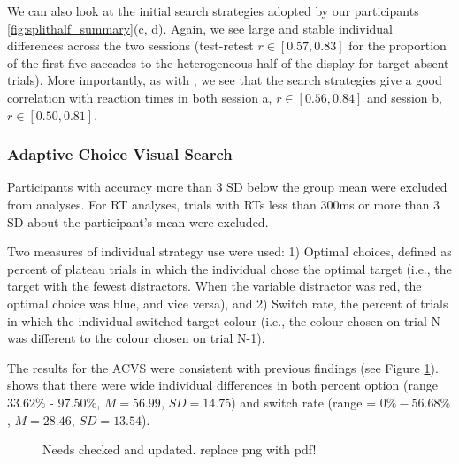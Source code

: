 \documentclass[]{rsos}%
\begin{document}
We can also look at the initial search strategies adopted by our participants \ref{fig:splithalf_summary}(c, d). Again, we see large and stable individual differences across the two sessions (test-retest $r \in [0.57, 0.83]$ for the proportion of the first five saccades to the heterogeneous half of the display for target absent trials). More importantly, as with \cite{nowakowska2017}, we see that the search strategies give a good correlation with reaction times in both session a, $r \in [0.56, 0.84]$ and session b, $r \in [0.50, 0.81]$.


\subsubsection{Adaptive Choice Visual Search}

Participants with accuracy more than 3 SD below the group mean were excluded from analyses. For RT analyses, trials with RTs less than 300ms or more than 3 SD about the participant's mean were excluded. 

Two measures of individual strategy use were used: 1) Optimal choices, defined as percent of plateau trials in which the individual chose the optimal target (i.e., the target with the fewest distractors. When the variable distractor was red, the optimal choice was blue, and vice versa), and 2) Switch rate, the percent of trials in which the individual switched target colour (i.e., the colour chosen on trial N was different to the colour chosen on trial N-1).  


The results for the ACVS were consistent with previous findings \cite{irons-leber2016,irons-leber2018} (see Figure \ref{fig:acvs_summary}). shows that there were wide individual differences in both percent option (range $33.62\%$ - $97.50\%$, $M = 56.99$, $SD = 14.75$) and switch rate (range = $0\% - 56.68\%$, $M = 28.46$, $SD = 13.54$). 

\begin{figure}
\centering
{}
\caption{Needs checked and updated. replace png with pdf!}
\label{fig:acvs_summary}
\end{figure}
\end{document}

